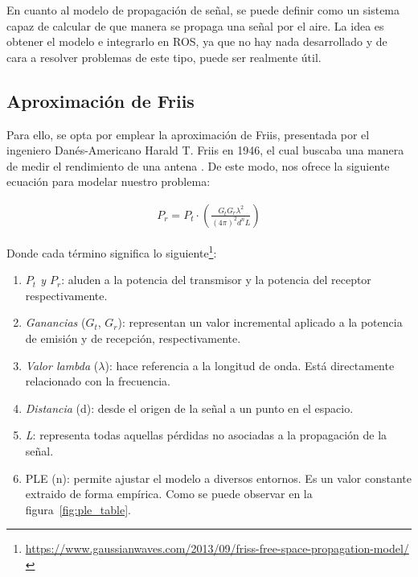 En cuanto al modelo de propagación de señal, se puede definir como un sistema capaz de calcular de que manera se propaga una señal por el aire. La idea es obtener el modelo e integrarlo en \ac{ROS}, ya que no hay nada desarrollado y de cara a resolver problemas de este tipo, puede ser realmente útil.\\

\subsection{Aproximación de Friis}
\label{subsec:friis}

Para ello, se opta por emplear la aproximación de Friis, presentada por el ingeniero Danés-Americano Harald T. Friis en 1946, el cual buscaba una manera de medir el rendimiento de una antena \cite{johnson1984antenna}. De este modo, nos ofrece la siguiente ecuación para modelar nuestro problema:

\begin{align}
    P_r = P_t \cdot \left( \frac{G_t G_r \lambda^2 }{(4 \pi)^2 d^n L} \right)
\end{align}

Donde cada término significa lo siguiente\footnote[2]{\url{https://www.gaussianwaves.com/2013/09/friss-free-space-propagation-model/}}:

\begin{enumerate}
    \item \emph{$P_t$ y $P_r$}: aluden a la potencia del transmisor y la potencia del receptor respectivamente.

    \item \emph{Ganancias} ($G_t$, $G_r$): representan un valor incremental aplicado a la potencia de emisión y de recepción, respectivamente.

    \item \emph{Valor lambda} ($\lambda$): hace referencia a la longitud de onda. Está directamente relacionado con la frecuencia.

    \item \emph{Distancia} (d): desde el origen de la señal a un punto en el espacio.

    \item \emph{L}: representa todas aquellas pérdidas no asociadas a la propagación de la señal.

    \item \ac{PLE} (n): permite ajustar el modelo a diversos entornos. Es un valor constante extraido de forma empírica. Como se puede observar en la figura~\ref{fig:ple_table}.
\end{enumerate}

